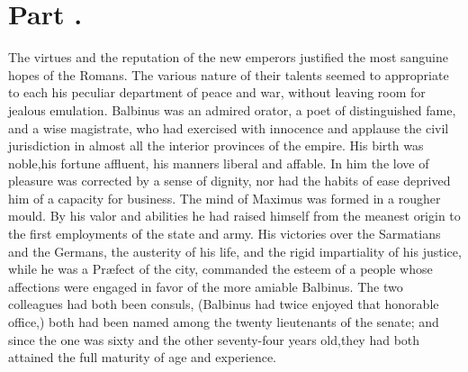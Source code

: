 \section{Part \thesection.}
\thispagestyle{simple}

The virtues and the reputation of the new emperors justified the
most sanguine hopes of the Romans. The various nature of their
talents seemed to appropriate to each his peculiar department of
peace and war, without leaving room for jealous emulation.
Balbinus was an admired orator, a poet of distinguished fame, and
a wise magistrate, who had exercised with innocence and applause
the civil jurisdiction in almost all the interior provinces of
the empire. His birth was noble,\footnotemark[28] his fortune affluent, his
manners liberal and affable. In him the love of pleasure was
corrected by a sense of dignity, nor had the habits of ease
deprived him of a capacity for business. The mind of Maximus was
formed in a rougher mould. By his valor and abilities he had
raised himself from the meanest origin to the first employments
of the state and army. His victories over the Sarmatians and the
Germans, the austerity of his life, and the rigid impartiality of
his justice, while he was a Præfect of the city, commanded the
esteem of a people whose affections were engaged in favor of the
more amiable Balbinus. The two colleagues had both been consuls,
(Balbinus had twice enjoyed that honorable office,) both had been
named among the twenty lieutenants of the senate; and since the
one was sixty and the other seventy-four years old,\footnotemark[29] they had
both attained the full maturity of age and experience.



